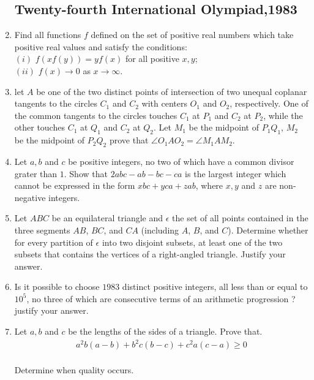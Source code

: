 \documentclass[12pt,-letter paper]{article}
\providecommand{\brak}[1]{\ensuremath{\left(#1\right)}}
\begin{document}
\begin{enumerate}

 \subsection*{Twenty-fourth International Olympiad,1983}
\item Find all functions $f$ defined on the set of positive real numbers which take positive real values and satisfy the conditions:\\
\brak{i} $f\brak{xf\brak{y}} = yf\brak{x}$ for all positive $x,y$;\\
\brak{ii} $f\brak{x} \rightarrow 0 $ as $ x \rightarrow \infty$.
\item let $A$ be one of the two distinct points of intersection of two unequal coplanar tangents to the circles $C_1$ and $C_2$ with centers $O_1$ and $O_2$, respectively. One of the common tangents to the circles touches $C_1$ at $P_1$ and $C_2$ at $P_2$, while the other touches $C_1$ at $Q_1$ and $C_2$ at $Q_2$.  Let $M_1$ be the midpoint of $P_1Q_1$, $M_2$ be the midpoint of $P_2Q_2$ prove that $\angle O_1AO_2 = \angle M_1AM_2$.
\item Let $a,b$ and $c$ be positive integers, no two of which have a  common divisor grater than $1$. Show that $2abc-ab-bc-ca$ is the largest integer which cannot be expressed in the form $xbc+yca+zab$, where $x,y$ and $z$ are non-negative integers.	
\item Let $ABC$ be an equilateral triangle and $\epsilon$ the set of all points contained in the three segments $AB$, $BC$, and $CA$ (including $A$, $B$, and $C$). Determine whether for every partition of $\epsilon$ into two disjoint subsets, at least one of the two subsets that contains the vertices of a right-angled triangle. Justify your answer.
\item Is it possible to choose $1983$ distinct positive integers, all less than or equal to $10^5$, no three of which are consecutive terms of an arithmetic progression ? justify your answer.	
\item Let $a,b$ and $c$ be the lengths of the sides of a triangle. Prove that.
	\begin{align*} a^2b \brak {a-b}+b^2c\brak{b-c}+c^2a\brak{c-a}\geq 0 \end{align*}
		\\Determine when quality occurs.










\end{enumerate}
\end{document}
